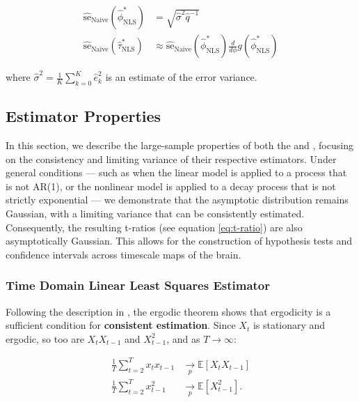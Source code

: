 \documentclass[main.tex]{subfiles}
\begin{document}
\begin{align} 
    \widehat{\text{se}}_\text{Naive}(\hat\phi^*_{\scriptscriptstyle\text{NLS}}) &= \sqrt{\hat\sigma^2 \hat q^{-1}}\\
    \widehat{\text{se}}_\text{Naive}(\hat\tau^*_{\scriptscriptstyle\text{NLS}}) &\approx \widehat{\text{se}}_{\text{Naive}}(\hat\phi^*_{\scriptscriptstyle\text{NLS}}) \frac{d}{d\phi} g(\hat\phi^*_{\scriptscriptstyle\text{NLS}})
\end{align}

\noindent where $\hat\sigma^2 = \frac{1}{K} \sum_{k=0}^K \hat e_k^2$ is an estimate of the error variance.\\

\subsection{Estimator Properties}
In this section, we describe the large-sample properties of both the  and , focusing on the consistency and limiting variance of their respective estimators. Under general conditions --- such as when the linear model is applied to a process that is not AR(1), or the nonlinear model is applied to a decay process that is not strictly exponential --- we demonstrate that the asymptotic distribution remains Gaussian, with a limiting variance that can be consistently estimated. Consequently, the resulting t-ratios (see equation \eqref{eq:t-ratio}) are also asymptotically Gaussian. This allows for the construction of hypothesis tests and confidence intervals across timescale maps of the brain.

\subsubsection{Time Domain Linear Least Squares Estimator}
Following the description in \citet[theorem~14.29]{hansen_econometrics_2022}, the ergodic theorem shows that ergodicity is a sufficient condition for \textbf{consistent estimation}. Since $X_t$ is stationary and ergodic, so too are $X_t X_{t-1}$ and $X_{t-1}^2$, and as $T \to \infty$:

\begin{align}
    \frac{1}{T} \sum_{t=2}^T x_t x_{t-1} &\underset{p}{\to} \mathbb{E}[X_t X_{t-1}]\\
    \frac{1}{T} \sum_{t=2}^T x_{t-1}^2 &\underset{p}{\to} \mathbb{E}[X_{t-1}^2].
\end{align}
\end{document}
